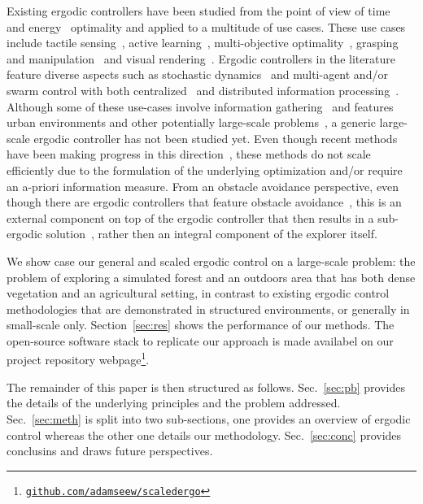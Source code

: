 \documentclass[letterpaper,10pt,conference,twoside]{IEEEtran}
\theoremstyle{definition}
\begin{document}
Existing ergodic controllers have been studied from the point of view of time~\cite{dong2023time} and energy~\cite{seewald2024energy,naveed2024eclares} optimality and applied to a multitude of use cases. These use cases include tactile sensing~\cite{abraham2017ergodic}, active learning~\cite{abraham2021ergodic}, multi-objective optimality~\cite{ren2023pareto,srinivasan2023multi}, grasping and manipulation~\cite{shetty2022ergodic,bilaloglu2023whole} and visual rendering~\cite{low2022drozbot,prabhakar2020autonomous}. Ergodic controllers in the literature feature diverse aspects such as stochastic dynamics~\cite{torre2016ergodic,ayvali2017ergodic} and multi-agent and/or swarm control with both centralized~\cite{seewald2024energy,rao2024learning} and distributed information processing~\cite{prabhakar2020ergodic,coffin2022multi}. Although some of these use-cases involve information gathering~\cite{dressel2018optimality} and features urban environments and other potentially large-scale problems~\cite{prabhakar2020ergodic,rao2023multi}, a generic large-scale ergodic controller has not been studied yet.
Even though recent methods have been making progress in this direction~\cite{whittemeyer2023bi,seewald2024energy,naveed2024eclares,dong2023time}, these methods do not scale efficiently due to the formulation of the underlying optimization and/or require an a-priori information measure. From an obstacle avoidance perspective, even though there are ergodic controllers that feature obstacle avoidance~\cite{lerch2023safety}, this is an external component on top of the ergodic controller that then results in a sub-ergodic solution~\cite{dong2023time}, rather then an integral component of the explorer itself.

We show case our general and scaled ergodic control on a large-scale problem: the problem of exploring a simulated forest and an outdoors area that has both dense vegetation and an agricultural setting, in contrast to existing ergodic control methodologies that are demonstrated in structured environments, or generally in small-scale only. Section~\ref{sec:res} shows the performance of our methods. 
The open-source software stack to replicate our approach is made availabel on our project repository webpage\footnote{\href{https://github.com/adamseew/scaledergo}{\tt github.com/adamseew/scaledergo}}.

The remainder of this paper is then structured as follows. Sec.~\ref{sec:pb} provides the details of the underlying principles and the problem addressed. Sec.~\ref{sec:meth} is split into two sub-sections, one provides an overview of ergodic control whereas the other one details our methodology. Sec.~\ref{sec:conc} provides conclusins and draws future perspectives.
\end{document}

